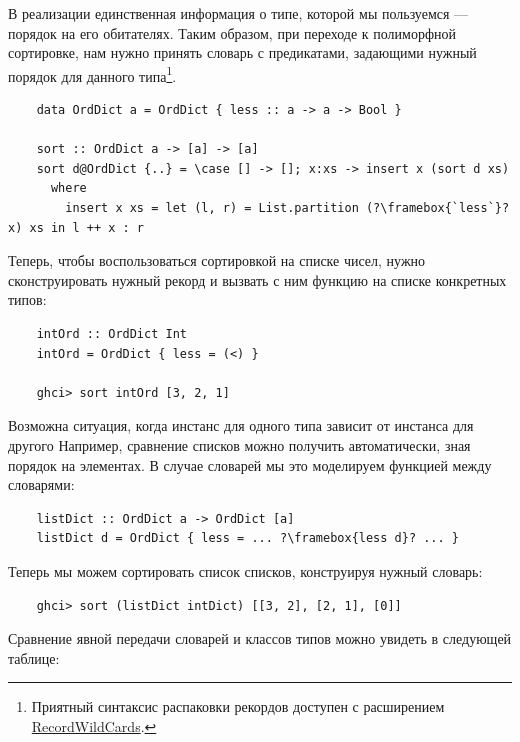 В реализации единственная информация о типе, которой мы пользуемся --- порядок на его обитателях.
Таким образом, при переходе к полиморфной сортировке, нам нужно принять словарь с предикатами, задающими нужный порядок для данного типа\footnote{Приятный синтаксис распаковки рекордов доступен с расширением \href{https://ghc.gitlab.haskell.org/ghc/doc/users_guide/exts/record_wildcards.html}{RecordWildCards}.}.
\begin{verbatim}
    data OrdDict a = OrdDict { less :: a -> a -> Bool }

    sort :: OrdDict a -> [a] -> [a]
    sort d@OrdDict {..} = \case [] -> []; x:xs -> insert x (sort d xs)
      where
        insert x xs = let (l, r) = List.partition (?\framebox{`less`}? x) xs in l ++ x : r
\end{verbatim}

Теперь, чтобы воспользоваться сортировкой на списке чисел, нужно сконструировать нужный рекорд и вызвать с ним функцию на списке конкретных типов:
\begin{verbatim}
    intOrd :: OrdDict Int
    intOrd = OrdDict { less = (<) }

    ghci> sort intOrd [3, 2, 1]
\end{verbatim}

Возможна ситуация, когда инстанс для одного типа зависит от инстанса для другого
Например, сравнение списков можно получить автоматически, зная порядок на элементах.
В случае словарей мы это моделируем функцией между словарями:
\begin{verbatim}
    listDict :: OrdDict a -> OrdDict [a]
    listDict d = OrdDict { less = ... ?\framebox{less d}? ... }
\end{verbatim}

Теперь мы можем сортировать список списков, конструируя нужный словарь:
\begin{verbatim}
    ghci> sort (listDict intDict) [[3, 2], [2, 1], [0]]
\end{verbatim}

Сравнение явной передачи словарей и классов типов можно увидеть в следующей таблице:

